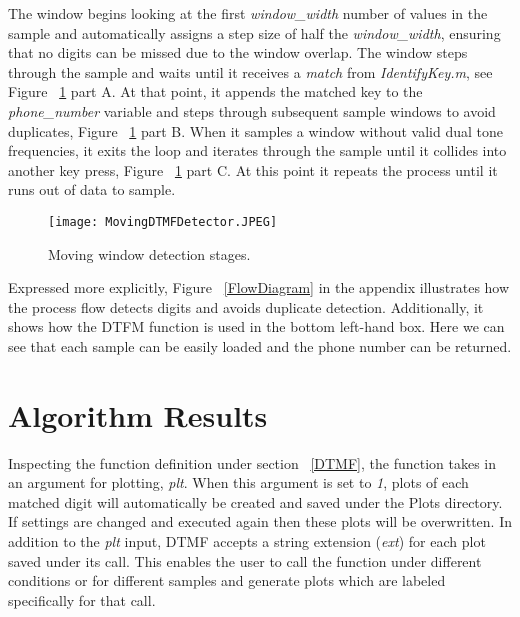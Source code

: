 \parSpace

The window begins looking at the first \textit{window\_width} number of values in the sample and automatically assigns a step size of half the \textit{window\_width}, ensuring that no digits can be missed due to the window overlap. The window steps through the sample and waits until it receives a \textit{match} from \textit{IdentifyKey.m}, see Figure ~\ref{WindowStages} part A. At that point, it appends the matched key to the \textit{phone\_number} variable and steps through subsequent sample windows to avoid duplicates, Figure ~\ref{WindowStages} part B. When it samples a window without valid dual tone frequencies, it exits the loop and iterates through the sample until it collides into another key press, Figure ~\ref{WindowStages} part C. At this point it repeats the process until it runs out of data to sample.

\begin{figure}[h!]
	\begin{center}
		\texttt{[image: MovingDTMFDetector.JPEG]}
	\end{center}
	\vspace{-1em}
	\caption{Moving window detection stages.}
	\label{WindowStages}
\end{figure}

Expressed more explicitly, Figure ~\ref{FlowDiagram} in the appendix illustrates how the process flow detects digits and avoids duplicate detection. Additionally, it shows how the DTFM function is used in the bottom left-hand box. Here we can see that each sample can be easily loaded and the phone number can be returned.


%
%

\section{Algorithm Results}

Inspecting the function definition under section ~\ref{DTMF}, the function takes in an argument for plotting, \textit{plt}. When this argument is set to \textit{1}, plots of each matched digit will automatically be created and saved under the Plots directory. If settings are changed and executed again then these plots will be overwritten. In addition to the \textit{plt} input, DTMF accepts a string extension (\textit{ext}) for each plot saved under its call. This enables the user to call the function under different conditions or for different samples and generate plots which are labeled specifically for that call.

